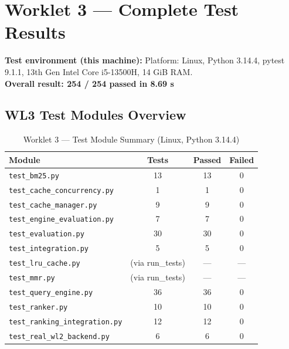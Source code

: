 \documentclass[12pt]{article}
\begin{document}
\section*{Worklet 3 --- Complete Test Results}

\textbf{Test environment (this machine):}
Platform: Linux, Python 3.14.4, pytest 9.1.1, 13th Gen Intel Core i5-13500H, 14 GiB RAM.\\
\textbf{Overall result: \textcolor{codegreen}{254 / 254 passed in 8.69 s}}

\subsection*{WL3 Test Modules Overview}

\begin{table}[H]
\centering
\caption{Worklet 3 --- Test Module Summary (Linux, Python 3.14.4)}
\begin{tabular}{|l|c|c|c|}
\hline
\textbf{Module}                      & \textbf{Tests} & \textbf{Passed} & \textbf{Failed} \\
\hline
\texttt{test\_bm25.py}               & 13             & 13              & 0 \\
\texttt{test\_cache\_concurrency.py} & 1              & 1               & 0 \\
\texttt{test\_cache\_manager.py}     & 9              & 9               & 0 \\
\texttt{test\_engine\_evaluation.py} & 7              & 7               & 0 \\
\texttt{test\_evaluation.py}         & 30             & 30              & 0 \\
\texttt{test\_integration.py}        & 5              & 5               & 0 \\
\texttt{test\_lru\_cache.py}         & (via run\_tests) & ---            & --- \\
\texttt{test\_mmr.py}                & (via run\_tests) & ---            & --- \\
\texttt{test\_query\_engine.py}      & 36             & 36              & 0 \\
\texttt{test\_ranker.py}             & 10             & 10              & 0 \\
\texttt{test\_ranking\_integration.py} & 12           & 12              & 0 \\
\texttt{test\_real\_wl2\_backend.py} & 6              & 6               & 0 \\

\end{tabular}
\end{table}
\end{document}
